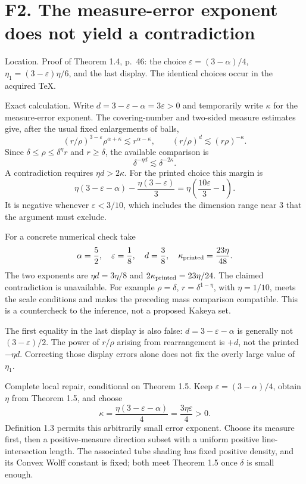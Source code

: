 \documentclass[10pt]{article}
\begin{document}
\section*{F2. The measure-error exponent does not yield a contradiction}
Location. Proof of Theorem 1.4, p. 46: the choice \(\varepsilon=(3-\alpha)/4\), \(\eta_1=(3-\varepsilon)\eta/6\), and the last display. The identical choices occur in the acquired TeX.\par
Exact calculation. Write \(d=3-\varepsilon-\alpha=3\varepsilon>0\) and temporarily write \(\kappa\) for the measure-error exponent. The covering-number and two-sided measure estimates give, after the usual fixed enlargements of balls, \[(r/\rho)^{3-\varepsilon}\rho^{\alpha+\kappa}
 \lesssim r^{\alpha-\kappa},
 \qquad
 (r/\rho)^d\lesssim(r\rho)^{-\kappa}.\] Since \(\delta\leq\rho\leq\delta^\eta r\) and \(r\geq\delta\), the available comparison is \[\delta^{-\eta d}\lesssim\delta^{-2\kappa}.\] A contradiction requires \(\eta d>2\kappa\). For the printed choice this margin is \[\eta(3-\varepsilon-\alpha)-\frac{\eta(3-\varepsilon)}3
 =\eta\left(\frac{10\varepsilon}{3}-1\right).\] It is negative whenever \(\varepsilon<3/10\), which includes the dimension range near 3 that the argument must exclude.\par
For a concrete numerical check take \[\alpha=\frac52,\quad \varepsilon=\frac18,\quad
 d=\frac38,\quad \kappa_{\rm printed}=\frac{23\eta}{48}.\] The two exponents are \(\eta d=3\eta/8\) and \(2\kappa_{\rm printed}=23\eta/24\). The claimed contradiction is unavailable. For example \(\rho=\delta\), \(r=\delta^{1-\eta}\), with \(\eta=1/10\), meets the scale conditions and makes the preceding mass comparison compatible. This is a countercheck to the inference, not a proposed Kakeya set.\par
The first equality in the last display is also false: \(d=3-\varepsilon-\alpha\) is generally not \((3-\varepsilon)/2\). The power of \(r/\rho\) arising from rearrangement is \(+d\), not the printed \(-\eta d\). Correcting those display errors alone does not fix the overly large value of \(\eta_1\).\par
Complete local repair, conditional on Theorem 1.5. Keep \(\varepsilon=(3-\alpha)/4\), obtain \(\eta\) from Theorem 1.5, and choose \[\kappa=\frac{\eta(3-\varepsilon-\alpha)}4=\frac{3\eta\varepsilon}{4}>0.\] Definition 1.3 permits this arbitrarily small error exponent. Choose its measure first, then a positive-measure direction subset with a uniform positive line-intersection length. The associated tube shading has fixed positive density, and its Convex Wolff constant is fixed; both meet Theorem 1.5 once \(\delta\) is small enough.\par
\end{document}
